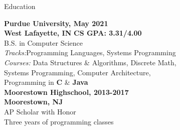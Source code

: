 \vspace{5.5cm}
\begin{center}
{\fontsize{24}{50}\selectfont Education}\\
\end{center}
\footnotesize
\raggedright
\textbf{Purdue University,
\hfill \textbf{May 2021}\\
West Lafayette, IN}
\hfill \textbf{CS GPA: 3.31/4.00}\\
\hspace{.5cm}  B.S. in Computer Science\\
\hspace{0.75cm}  \textit{Tracks:}\hspace{0.32cm}Programming Languages, Systems Programming\\
\vspace{5pt}
\hspace{0.75cm}  \textit{Courses:} Data Structures \& Algorithms, Discrete Math,\\
\hspace{2.65cm}Systems Programming, Computer Architecture,\\
\hspace{2.65cm}Programming in \textbf{C} \& \textbf{Java}\\
\vspace{5pt}
\textbf{Moorestown Highschool,
\hfill \textbf{2013-2017}\\
Moorestown, NJ}\\
\hspace{0.75cm}  AP Scholar with Honor\\
\hspace{0.75cm}  Three years of programming classes\\